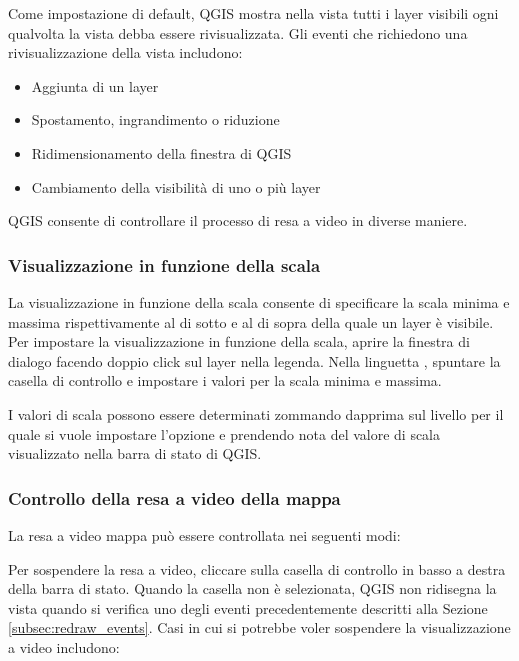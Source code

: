 Come impostazione di default, QGIS mostra nella vista tutti i layer visibili
ogni qualvolta la vista debba essere rivisualizzata. Gli eventi che richiedono
una rivisualizzazione della vista includono:

\begin{itemize}
\item Aggiunta di un layer
\item Spostamento, ingrandimento o riduzione
\item Ridimensionamento della finestra di QGIS
\item Cambiamento della visibilità di uno o più layer
\end{itemize}

QGIS consente di controllare il processo di resa a video in diverse maniere.

\subsubsection{Visualizzazione in funzione della scala}
\label{label_scaledepend}

La visualizzazione in funzione della scala consente di specificare la scala
minima e massima rispettivamente al di sotto e al di sopra della quale un
layer è visibile. Per impostare la visualizzazione in funzione della scala,
aprire la finestra di dialogo  facendo doppio click sul
layer nella legenda. Nella linguetta , spuntare la casella di
controllo   e impostare i valori per la scala minima e massima.

I valori di scala possono essere determinati zommando dapprima sul livello per
il quale si vuole impostare l'opzione e prendendo nota del valore di scala
visualizzato nella barra di stato di QGIS.

\subsubsection{Controllo della resa a video della mappa}\label{label_controlmap}

La resa a video mappa può essere controllata nei seguenti modi:

\label{label_suspendrender}

Per sospendere la resa a video, cliccare sulla casella di controllo
 in basso a destra della barra di stato. Quando la casella
 non è selezionata, QGIS non ridisegna la vista quando si
verifica uno degli eventi precedentemente descritti alla Sezione
\ref{subsec:redraw_events}. Casi in cui si potrebbe voler sospendere la
visualizzazione a video includono:

